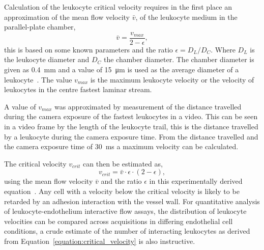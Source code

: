 Calculation of the leukocyte critical velocity requires in the first place an approximation of the mean flow velocity $\bar{v}$, of the leukocyte medium in the parallel-plate chamber,
\begin{equation}
	\bar{v}=\frac{v_{max}}{2-\epsilon},
\end{equation}
this is based on some known parameters and the ratio $\epsilon = D_L/D_C$. Where $D_L$ is the leukocyte diameter and $D_C$ the chamber diameter. The chamber diameter is given as \SI{0.4}{\milli\meter} and a value of \SI{15}{\micro\meter} is used as the average diameter of a leukocyte~\cite{Dorgan1998}. The value $v_{max}$ is the maximum leukocyte velocity or the velocity of leukocytes in the centre fastest laminar stream. 

A value of $v_{max}$ was approximated by measurement of the distance travelled during the camera exposure of the fastest leukocytes in a video. This can be seen in a video frame by the length of the leukocyte trail, this is the distance travelled by a leukocyte during the camera exposure time. From the distance travelled and the camera exposure time of \SI{30}{\milli\second} a maximum velocity can be calculated.

The critical velocity $v_{crit}$ can then be estimated as,
\begin{equation}
	v_{crit}=\bar{v}\cdot\epsilon\cdot(2-\epsilon),
\label{equation:critical_velocity}
\end{equation}
using the mean flow velocity $\bar{v}$ and the ratio $\epsilon$ in this experimentally derived equation~\cite{Ley1991}. Any cell with a velocity below the critical velocity is likely to be retarded by an adhesion interaction with the vessel wall. For quantitative analysis of leukocyte-endothelium interactive flow assays, the distribution of leukocyte velocities can be compared across acquisitions in differing endothelial cell conditions, a crude estimate of the number of interacting leukocytes as derived from Equation~\ref{equation:critical_velocity} is also instructive.

